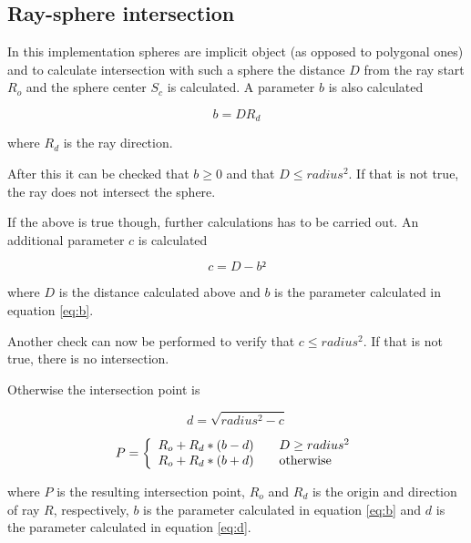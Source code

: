 \documentclass[a4paper]{report}
\begin{document}
\subsection{Ray-sphere intersection}

In this implementation spheres are implicit object (as opposed to
polygonal ones) and to calculate intersection with such a sphere the
distance \(D\) from the ray start \(R_o\) and the sphere center \(S_c\) is
calculated. A parameter \(b\) is also calculated 

\begin{equation}
 b = D R_d
 \label{eq:b}
\end{equation}

where \(R_d\) is the ray direction.

After this it can be checked that \(b \geq 0\) and that \(D \leq
radius^2\). If that is not true, the ray does not intersect the
sphere.

If the above is true though, further calculations has to be carried
out. An additional parameter \(c\) is calculated

\begin{equation}
  c = D - b²
\end{equation}

where \(D\) is the distance calculated above and \(b\) is the
parameter calculated in equation \ref{eq:b}.

Another check can now be performed to verify that \(c \leq radius^2\). If
that is not true, there is no intersection.

Otherwise the intersection point is

\begin{equation}
  d = \sqrt{radius^2 - c}
  \label{eq:d}
\end{equation}

\begin{equation}
  P = \left \{ 
  \begin{array}{l l}
    R_o + R_d *(b-d) & \quad D \geq radius^2 \\
    R_o + R_d *(b+d) & \quad \text{otherwise} \\
  \end{array} \right.
\end{equation}

where \(P\) is the resulting intersection point, \(R_o\) and \(R_d\)
is the origin and direction of ray \(R\), respectively, \(b\) is the
parameter calculated in equation \ref{eq:b} and \(d\) is the parameter
calculated in equation \ref{eq:d}.
\end{document}
